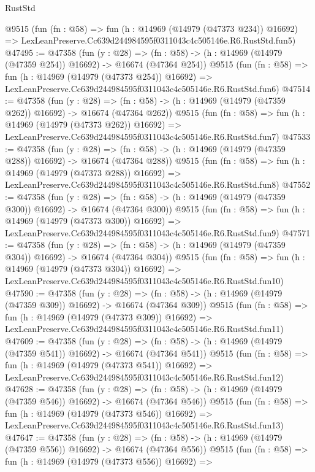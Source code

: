 \begin{lexlean}{RustStd}
\begin{coremodule}
    @9515
    (fun (fn : @58) =>
    fun (h : @14969 (@14979 (@47373 @234)) @16692) =>
    LexLeanPreserve.Cc639d244984595f0311043c4c505146e.R6.RustStd.fun5)
@47495 := @47358
    (fun (y : @28) =>
    (fn : @58) -> (h : @14969 (@14979 (@47359 @254)) @16692) -> @16674 (@47364 @254))
    @9515
    (fun (fn : @58) =>
    fun (h : @14969 (@14979 (@47373 @254)) @16692) =>
    LexLeanPreserve.Cc639d244984595f0311043c4c505146e.R6.RustStd.fun6)
@47514 := @47358
    (fun (y : @28) =>
    (fn : @58) -> (h : @14969 (@14979 (@47359 @262)) @16692) -> @16674 (@47364 @262))
    @9515
    (fun (fn : @58) =>
    fun (h : @14969 (@14979 (@47373 @262)) @16692) =>
    LexLeanPreserve.Cc639d244984595f0311043c4c505146e.R6.RustStd.fun7)
@47533 := @47358
    (fun (y : @28) =>
    (fn : @58) -> (h : @14969 (@14979 (@47359 @288)) @16692) -> @16674 (@47364 @288))
    @9515
    (fun (fn : @58) =>
    fun (h : @14969 (@14979 (@47373 @288)) @16692) =>
    LexLeanPreserve.Cc639d244984595f0311043c4c505146e.R6.RustStd.fun8)
@47552 := @47358
    (fun (y : @28) =>
    (fn : @58) -> (h : @14969 (@14979 (@47359 @300)) @16692) -> @16674 (@47364 @300))
    @9515
    (fun (fn : @58) =>
    fun (h : @14969 (@14979 (@47373 @300)) @16692) =>
    LexLeanPreserve.Cc639d244984595f0311043c4c505146e.R6.RustStd.fun9)
@47571 := @47358
    (fun (y : @28) =>
    (fn : @58) -> (h : @14969 (@14979 (@47359 @304)) @16692) -> @16674 (@47364 @304))
    @9515
    (fun (fn : @58) =>
    fun (h : @14969 (@14979 (@47373 @304)) @16692) =>
    LexLeanPreserve.Cc639d244984595f0311043c4c505146e.R6.RustStd.fun10)
@47590 := @47358
    (fun (y : @28) =>
    (fn : @58) -> (h : @14969 (@14979 (@47359 @309)) @16692) -> @16674 (@47364 @309))
    @9515
    (fun (fn : @58) =>
    fun (h : @14969 (@14979 (@47373 @309)) @16692) =>
    LexLeanPreserve.Cc639d244984595f0311043c4c505146e.R6.RustStd.fun11)
@47609 := @47358
    (fun (y : @28) =>
    (fn : @58) -> (h : @14969 (@14979 (@47359 @541)) @16692) -> @16674 (@47364 @541))
    @9515
    (fun (fn : @58) =>
    fun (h : @14969 (@14979 (@47373 @541)) @16692) =>
    LexLeanPreserve.Cc639d244984595f0311043c4c505146e.R6.RustStd.fun12)
@47628 := @47358
    (fun (y : @28) =>
    (fn : @58) -> (h : @14969 (@14979 (@47359 @546)) @16692) -> @16674 (@47364 @546))
    @9515
    (fun (fn : @58) =>
    fun (h : @14969 (@14979 (@47373 @546)) @16692) =>
    LexLeanPreserve.Cc639d244984595f0311043c4c505146e.R6.RustStd.fun13)
@47647 := @47358
    (fun (y : @28) =>
    (fn : @58) -> (h : @14969 (@14979 (@47359 @556)) @16692) -> @16674 (@47364 @556))
    @9515
    (fun (fn : @58) =>
    fun (h : @14969 (@14979 (@47373 @556)) @16692) =>

\end{coremodule}
\end{lexlean}
